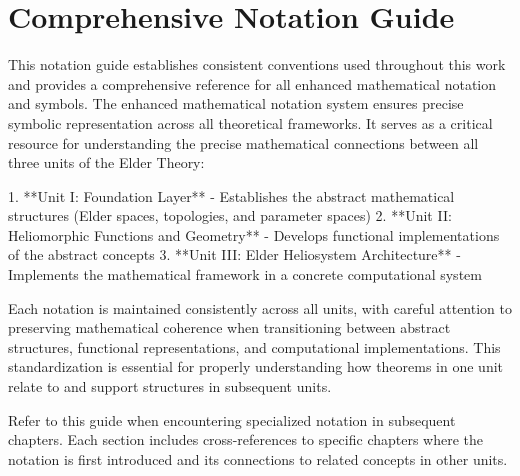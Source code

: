 \chapter*{Comprehensive Notation Guide}
\label{chap:notation_guide}

This notation guide establishes consistent conventions used throughout this work and provides a comprehensive reference for all enhanced mathematical notation and symbols. The enhanced mathematical notation system ensures precise symbolic representation across all theoretical frameworks. It serves as a critical resource for understanding the precise mathematical connections between all three units of the Elder Theory: 

1. **Unit I: Foundation Layer** - Establishes the abstract mathematical structures (Elder spaces, topologies, and parameter spaces)
2. **Unit II: Heliomorphic Functions and Geometry** - Develops functional implementations of the abstract concepts
3. **Unit III: Elder Heliosystem Architecture** - Implements the mathematical framework in a concrete computational system

Each notation is maintained consistently across all units, with careful attention to preserving mathematical coherence when transitioning between abstract structures, functional representations, and computational implementations. This standardization is essential for properly understanding how theorems in one unit relate to and support structures in subsequent units.

Refer to this guide when encountering specialized notation in subsequent chapters. Each section includes cross-references to specific chapters where the notation is first introduced and its connections to related concepts in other units.

